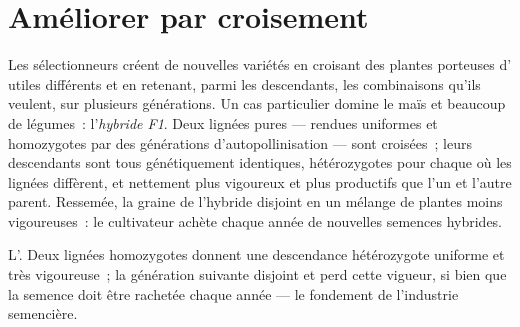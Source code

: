 \section{Améliorer par croisement}

\begin{proposition}\label{prop:g12:domesticated-plants:hybrids}
Les sélectionneurs créent de nouvelles variétés en croisant des
plantes porteuses d' utiles différents et en retenant, parmi
les descendants, les combinaisons qu'ils veulent, sur plusieurs
générations. Un cas particulier domine le maïs et beaucoup de
légumes~: l'\emph{hybride F1}. Deux lignées
pures --- rendues uniformes et homozygotes par des générations
d'autopollinisation --- sont croisées~; leurs descendants sont tous
génétiquement identiques, hétérozygotes pour chaque  où les
lignées diffèrent, et nettement plus vigoureux et plus productifs que
l'un et l'autre parent. Ressemée, la graine de l'hybride disjoint en
un mélange de plantes moins vigoureuses~: le cultivateur achète chaque
année de nouvelles semences hybrides.
\end{proposition}
\admitted

\begin{omfigure}

{\small L'. Deux lignées homozygotes donnent une descendance
hétérozygote uniforme et très vigoureuse~; la génération suivante
disjoint et perd cette vigueur, si bien que la semence doit être
rachetée chaque année --- le fondement de l'industrie semencière.}
\end{omfigure}

